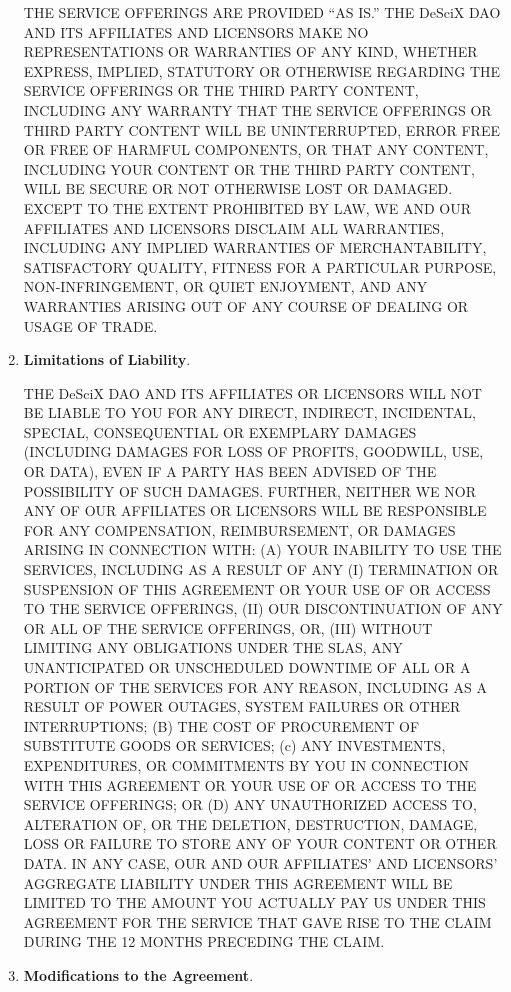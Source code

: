 \documentclass{article}
\begin{document}
\begin{enumerate}
    THE SERVICE OFFERINGS ARE PROVIDED “AS IS.” THE DeSciX DAO AND ITS AFFILIATES AND LICENSORS MAKE NO REPRESENTATIONS OR WARRANTIES OF ANY KIND, WHETHER EXPRESS, IMPLIED, STATUTORY OR OTHERWISE REGARDING THE SERVICE OFFERINGS OR THE THIRD PARTY CONTENT, INCLUDING ANY WARRANTY THAT THE SERVICE OFFERINGS OR THIRD PARTY CONTENT WILL BE UNINTERRUPTED, ERROR FREE OR FREE OF HARMFUL COMPONENTS, OR THAT ANY CONTENT, INCLUDING YOUR CONTENT OR THE THIRD PARTY CONTENT, WILL BE SECURE OR NOT OTHERWISE LOST OR DAMAGED. EXCEPT TO THE EXTENT PROHIBITED BY LAW, WE AND OUR AFFILIATES AND LICENSORS DISCLAIM ALL WARRANTIES, INCLUDING ANY IMPLIED WARRANTIES OF MERCHANTABILITY, SATISFACTORY QUALITY, FITNESS FOR A PARTICULAR PURPOSE, NON-INFRINGEMENT, OR QUIET ENJOYMENT, AND ANY WARRANTIES ARISING OUT OF ANY COURSE OF DEALING OR USAGE OF TRADE.

    \item \textbf{Limitations of Liability}. \label{sec:dpaas_liability}

    THE DeSciX DAO AND ITS AFFILIATES OR LICENSORS WILL NOT BE LIABLE TO YOU FOR ANY DIRECT, INDIRECT, INCIDENTAL, SPECIAL, CONSEQUENTIAL OR EXEMPLARY DAMAGES (INCLUDING DAMAGES FOR LOSS OF PROFITS, GOODWILL, USE, OR DATA), EVEN IF A PARTY HAS BEEN ADVISED OF THE POSSIBILITY OF SUCH DAMAGES. FURTHER, NEITHER WE NOR ANY OF OUR AFFILIATES OR LICENSORS WILL BE RESPONSIBLE FOR ANY COMPENSATION, REIMBURSEMENT, OR DAMAGES ARISING IN CONNECTION WITH: (A) YOUR INABILITY TO USE THE SERVICES, INCLUDING AS A RESULT OF ANY (I) TERMINATION OR SUSPENSION OF THIS AGREEMENT OR YOUR USE OF OR ACCESS TO THE SERVICE OFFERINGS, (II) OUR DISCONTINUATION OF ANY OR ALL OF THE SERVICE OFFERINGS, OR, (III) WITHOUT LIMITING ANY OBLIGATIONS UNDER THE SLAS, ANY UNANTICIPATED OR UNSCHEDULED DOWNTIME OF ALL OR A PORTION OF THE SERVICES FOR ANY REASON, INCLUDING AS A RESULT OF POWER OUTAGES, SYSTEM FAILURES OR OTHER INTERRUPTIONS; (B) THE COST OF PROCUREMENT OF SUBSTITUTE GOODS OR SERVICES; (c) ANY INVESTMENTS, EXPENDITURES, OR COMMITMENTS BY YOU IN CONNECTION WITH THIS AGREEMENT OR YOUR USE OF OR ACCESS TO THE SERVICE OFFERINGS; OR (D) ANY UNAUTHORIZED ACCESS TO, ALTERATION OF, OR THE DELETION, DESTRUCTION, DAMAGE, LOSS OR FAILURE TO STORE ANY OF YOUR CONTENT OR OTHER DATA. IN ANY CASE, OUR AND OUR AFFILIATES’ AND LICENSORS’ AGGREGATE LIABILITY UNDER THIS AGREEMENT WILL BE LIMITED TO THE AMOUNT YOU ACTUALLY PAY US UNDER THIS AGREEMENT FOR THE SERVICE THAT GAVE RISE TO THE CLAIM DURING THE 12 MONTHS PRECEDING THE CLAIM.

    \item \textbf{Modifications to the Agreement}. \label{sec:dpaas_modifications}


\end{enumerate}
\end{document}
